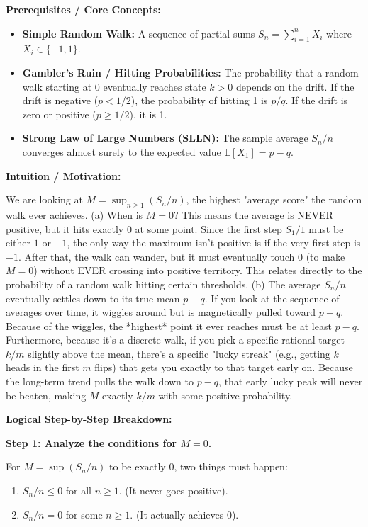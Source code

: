 \begin{solution}
\textbf{Prerequisites / Core Concepts:}
\begin{itemize}
    \item \textbf{Simple Random Walk:} A sequence of partial sums $S_n = \sum_{i=1}^n X_i$ where $X_i \in \{-1, 1\}$.
    \item \textbf{Gambler's Ruin / Hitting Probabilities:} The probability that a random walk starting at 0 eventually reaches state $k > 0$ depends on the drift. If the drift is negative ($p < 1/2$), the probability of hitting 1 is $p/q$. If the drift is zero or positive ($p \geq 1/2$), it is 1.
    \item \textbf{Strong Law of Large Numbers (SLLN):} The sample average $S_n/n$ converges almost surely to the expected value $\mathbb{E}[X_1] = p-q$.
\end{itemize}

\textbf{Intuition / Motivation:}

We are looking at $M = \sup_{n \ge 1} (S_n/n)$, the highest "average score" the random walk ever achieves.
(a) When is $M=0$? This means the average is NEVER positive, but it hits exactly 0 at some point. Since the first step $S_1/1$ must be either $1$ or $-1$, the only way the maximum isn't positive is if the very first step is $-1$. After that, the walk can wander, but it must eventually touch 0 (to make $M=0$) without EVER crossing into positive territory. This relates directly to the probability of a random walk hitting certain thresholds.
(b) The average $S_n/n$ eventually settles down to its true mean $p-q$. If you look at the sequence of averages over time, it wiggles around but is magnetically pulled toward $p-q$. Because of the wiggles, the *highest* point it ever reaches must be at least $p-q$. Furthermore, because it's a discrete walk, if you pick a specific rational target $k/m$ slightly above the mean, there's a specific "lucky streak" (e.g., getting $k$ heads in the first $m$ flips) that gets you exactly to that target early on. Because the long-term trend pulls the walk down to $p-q$, that early lucky peak will never be beaten, making $M$ exactly $k/m$ with some positive probability.

\textbf{Logical Step-by-Step Breakdown:}

\textbf{Step 1: Analyze the conditions for $M=0$.}

For $M = \sup (S_n/n)$ to be exactly 0, two things must happen:
\begin{enumerate}
    \item $S_n/n \leq 0$ for all $n \geq 1$. (It never goes positive).
    \item $S_n/n = 0$ for some $n \geq 1$. (It actually achieves 0).
\end{enumerate}


\end{solution}
